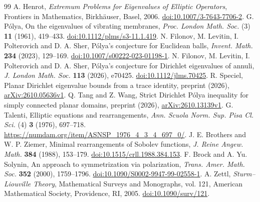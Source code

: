 \clearpage
\begin{thebibliography}{99}
 A. Henrot, \emph{Extremum Problems for Eigenvalues of Elliptic Operators}, Frontiers in Mathematics, Birkh\"auser, Basel, 2006. \href{https://doi.org/10.1007/3-7643-7706-2}{doi:10.1007/3-7643-7706-2}.
 G. P\'olya, On the eigenvalues of vibrating membranes, \emph{Proc. London Math. Soc.} (3) \textbf{11} (1961), 419--433. \href{https://doi.org/10.1112/plms/s3-11.1.419}{doi:10.1112/plms/s3-11.1.419}.
 N. Filonov, M. Levitin, I. Polterovich and D. A. Sher, P\'olya's conjecture for Euclidean balls, \emph{Invent. Math.} \textbf{234} (2023), 129--169. \href{https://doi.org/10.1007/s00222-023-01198-1}{doi:10.1007/s00222-023-01198-1}.
 N. Filonov, M. Levitin, I. Polterovich and D. A. Sher, P\'olya's conjecture for Dirichlet eigenvalues of annuli, \emph{J. London Math. Soc.} \textbf{113} (2026), e70425. \href{https://doi.org/10.1112/jlms.70425}{doi:10.1112/jlms.70425}.
 R. Speciel, Planar Dirichlet eigenvalue bounds from a trace identity, preprint (2026), \href{https://arxiv.org/abs/2610.05636v1}{arXiv:2610.05636v1}.
 Q. Tang and Z. Wang, Strict Dirichlet P\'olya inequality for simply connected planar domains, preprint (2026), \href{https://arxiv.org/abs/2610.13139v1}{arXiv:2610.13139v1}.
 G. Talenti, Elliptic equations and rearrangements, \emph{Ann. Scuola Norm. Sup. Pisa Cl. Sci.} (4) \textbf{3} (1976), 697--718. \url{https://numdam.org/item/ASNSP_1976_4_3_4_697_0/}.
 J. E. Brothers and W. P. Ziemer, Minimal rearrangements of Sobolev functions, \emph{J. Reine Angew. Math.} \textbf{384} (1988), 153--179. \href{https://doi.org/10.1515/crll.1988.384.153}{doi:10.1515/crll.1988.384.153}.
 F. Brock and A. Yu. Solynin, An approach to symmetrization via polarization, \emph{Trans. Amer. Math. Soc.} \textbf{352} (2000), 1759--1796. \href{https://doi.org/10.1090/S0002-9947-99-02558-1}{doi:10.1090/S0002-9947-99-02558-1}.
 A. Zettl, \emph{Sturm--Liouville Theory}, Mathematical Surveys and Monographs, vol. 121, American Mathematical Society, Providence, RI, 2005. \href{https://doi.org/10.1090/surv/121}{doi:10.1090/surv/121}.
\end{thebibliography}
